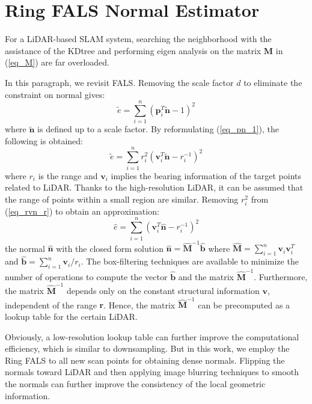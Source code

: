 \documentclass[letterpaper, 10 pt, conference]{ieeeconf}  %
\begin{document}
\section{Ring FALS Normal Estimator}
\label{sec:ring_fals}
For a LiDAR-based SLAM system, searching the neighborhood with the assistance of the KDtree and performing eigen analysis on the matrix $\boldsymbol{M}$ in (\ref{eq_M}) are far overloaded.

In this paragraph, we revisit FALS\cite{badino2011fast}.
Removing the scale factor $d$ to eliminate the constraint on normal gives:
\begin{equation}
        \widetilde{e} = \sum_{i = 1}^{n}(\boldsymbol{p}_i^T \widetilde{\boldsymbol{n}} - 1)^2
        \label{eq_pn_1}
\end{equation}
where $ \widetilde{\boldsymbol{n}}$ is defined up to a scale factor.
By reformulating (\ref{eq_pn_1}), the following is obtained:
\begin{equation}
        \widetilde{e} = \sum_{i = 1}^{n}r_i^2(\boldsymbol{v}_i^T \widetilde{\boldsymbol{n}} - r_i^{-1})^2
        \label{eq_rvn_r}
\end{equation}
where $r_i$ is the range and $\boldsymbol{v}_i$ implies the bearing information of the target points related to LiDAR.
Thanks to the high-resolution LiDAR, it can be assumed that the range of points within a small region are similar.
Removing $r_i^2$ from (\ref{eq_rvn_r}) to obtain an approximation:
\begin{equation}
        \widehat{e} = \sum_{i = 1}^{n}(\boldsymbol{v}_i^T \widehat{\boldsymbol{n}} - r_i^{-1})^2
        \label{eq_vn_r}
\end{equation}
the normal $\widehat{\boldsymbol{n}}$ with the closed form solution $\widehat{\boldsymbol{n}} = \widehat{\boldsymbol{M}}^{-1}\widehat{\boldsymbol{b}}$ where $\widehat{\boldsymbol{M}} =  \sum_{i = 1}^{n}\boldsymbol{v}_i\boldsymbol{v}_i^T$ and $\widehat{\boldsymbol{b}} = \sum_{i = 1}^{n}\boldsymbol{v}_i/r_i$.
The box-filtering techniques\cite{mcdonnell1981box} are available to minimize the number of operations to compute the vector $\widehat{\boldsymbol{b}}$ and the matrix $\widehat{\boldsymbol{M}}^{-1}$.
Furthermore, the matrix $\widehat{\boldsymbol{M}}^{-1}$ depends only on the constant structural information $\boldsymbol{v}$, independent of the range $\boldsymbol{r}$.
Hence, the matrix $\widehat{\boldsymbol{M}}^{-1}$ can be precomputed as a lookup table for the certain LiDAR.

Obviously, a low-resolution lookup table can further improve the computational efficiency, which is similar to downsampling.
But in this work, we employ the Ring FALS to all new scan points for obtaining dense normals.
Flipping the normals toward LiDAR and then applying image blurring techniques to smooth the normals can further improve the consistency of the local geometric information.
\end{document}
